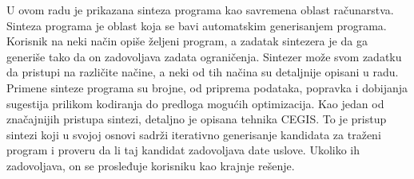 \abstract

U ovom radu je prikazana sinteza programa kao savremena oblast računarstva. Sinteza programa je oblast koja se bavi automatskim generisanjem programa. Korisnik na neki način opiše željeni program, a zadatak sintezera je da ga generiše tako da on zadovoljava zadata ograničenja. Sintezer može svom zadatku da pristupi na različite načine, a neki od tih načina su detaljnije opisani u radu. Primene sinteze programa su brojne, od priprema podataka, popravka i dobijanja sugestija prilikom kodiranja do predloga mogućih optimizacija. Kao jedan od značajnijih pristupa sintezi, detaljno je opisana tehnika CEGIS. To je pristup sintezi koji u svojoj osnovi sadrži iterativno generisanje kandidata za traženi program i proveru da li taj kandidat zadovoljava date uslove. Ukoliko ih zadovoljava, on se prosleđuje korisniku kao krajnje rešenje.
